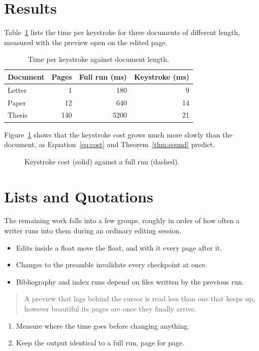 \documentclass[11pt]{article}
\begin{document}
\section{Results}\label{sec:results}
Table~\ref{tab:times} lists the time per keystroke for three documents of
different length, measured with the preview open on the edited page.
\begin{table}[ht]
  \centering
  \begin{tabular}{lrrr}
    \toprule
    Document & Pages & Full run (ms) & Keystroke (ms) \\
    \midrule
    Letter & 1 & 180 & 9 \\
    Paper & 12 & 640 & 14 \\
    Thesis & 140 & 5200 & 21 \\
    \bottomrule
  \end{tabular}
  \caption{Time per keystroke against document length.}\label{tab:times}
\end{table}
Figure~\ref{fig:growth} shows that the keystroke cost grows much more slowly than
the document, as Equation~\eqref{eq:cost} and Theorem~\ref{thm:sound} predict.
\begin{figure}[ht]
  \centering
  \caption{Keystroke cost (solid) against a full run (dashed).}\label{fig:growth}
\end{figure}

\lipsum[13-20]

\section{Lists and Quotations}
The remaining work falls into a few groups, roughly in order of how often a
writer runs into them during an ordinary editing session.
\begin{itemize}
  \item Edits inside a float move the float, and with it every page after it.
  \item Changes to the preamble invalidate every checkpoint at once.
  \item Bibliography and index runs depend on files written by the previous run.
\end{itemize}
\begin{quote}
A preview that lags behind the cursor is read less than one that keeps up,
however beautiful its pages are once they finally arrive.
\end{quote}
\begin{enumerate}
  \item Measure where the time goes before changing anything.
  \item Keep the output identical to a full run, page for page.
\end{enumerate}
\end{document}
